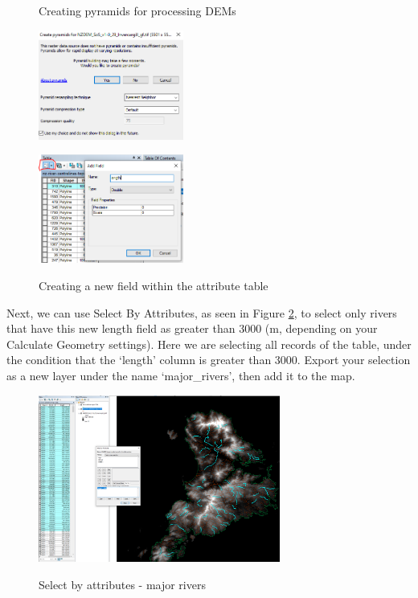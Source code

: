 \documentclass{article}
\begin{document}
\begin{figure}[h]
  \centering
  \begin{minipage}[b]{0.4\textwidth}
    \centering
    \caption{Creating pyramids for processing DEMs}
    \includegraphics[width=180px]{images/part3/createpyramids.PNG}
    \label{3_pyramids}
  \end{minipage}
  \hfill
  \begin{minipage}[b]{0.4\textwidth}
    \centering
    \caption{Creating a new field within the attribute table}
    \includegraphics[width=180px]{images/part3/newattribute.PNG}
    \label{3_newattribute}
  \end{minipage}
\end{figure}

Next, we can use Select By Attributes, as seen in Figure \ref{3_majorrivers}, to select only rivers that have this new length field as greater than 3000 (m, depending on your Calculate Geometry settings). Here we are selecting all records of the table, under the condition that the `length' column is greater than 3000. Export your selection as a new layer under the name `major\_rivers', then add it to the map.

\begin{figure}[h]
  \centering
  \caption{Select by attributes - major rivers}
  \includegraphics[width=300px]{images/part3/selection_majorrivers.PNG}
  \label{3_majorrivers}
\end{figure}
\end{document}
